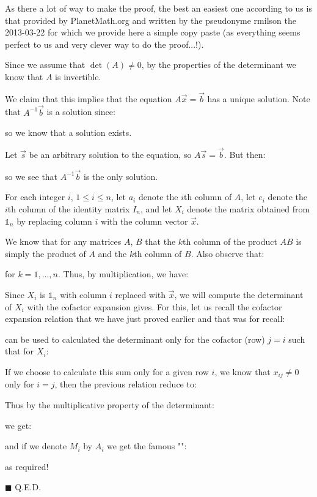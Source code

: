 	As there a lot of way to make the proof, the best an easiest one according to us is that provided by PlanetMath.org and written by the pseudonyme rmilson the 2013-03-22 for which we provide here a simple copy paste (as everything seems perfect to us and very clever way to do the proof...!).
	\begin{dem}
	Since we assume that $\det(A)\neq 0$, by the properties of the determinant we know that $A$ is invertible.
	
	We claim that this implies that the equation $A\vec{x}=\vec{b}$ has a unique solution. Note that $A^{-1}\vec{b}$ is a solution since:
	
	so we know that a solution exists.
	
	Let $\vec{s}$ be an arbitrary solution to the equation, so $A\vec{s}=\vec{b}$. But then:
	
	so we see that $A^{-1}\vec{b}$ is the only solution.
	
	For each integer $i$, $1\leq i\leq n$, let $a_i$ denote the $i$th column of $A$, let $e_i$ denote the $i$th column of the identity matrix $I_n$, and let $X_i$ denote the matrix obtained from $\mathds{1}_n$ by replacing column $i$ with the column vector $\vec{x}$.

	We know that for any matrices $A$, $B$ that the $k$th column of the product $AB$ is simply the product of $A$ and the $k$th column of $B$. Also observe that:
	
	for $k=1,...,n$. Thus, by multiplication, we have:
	
	Since $X_i$ is $\mathds{1}_n$ with column $i$ replaced with $\vec{x}$, we will compute the determinant of $X_i$ with the cofactor expansion gives. For this, let us recall the cofactor expansion relation that we have just proved earlier and that was for recall:
	
	can be used to calculated the determinant only for the cofactor (row) $j=i$ such that for $X_i$:
	
	If we choose to calculate this sum only for a given row $i$, we know that $x_{ij}\neq 0$ only for $i=j$, then the previous relation reduce to:
	
	Thus by the multiplicative property of the determinant:
	
	we get:
	
	and if we denote $M_i$ by $A_i$ we get the famous "":
	
	as required!
	\begin{flushright}
		$\blacksquare$  Q.E.D.
	\end{flushright}
	\end{dem}
	
